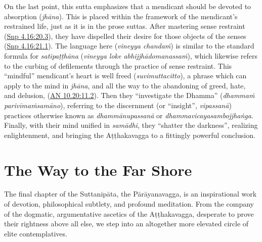 \documentclass[12pt,openany]{book}%
\begin{document}
On the last point, this sutta emphasizes that a mendicant should be devoted to absorption (\textit{\textsanskrit{jhāna}}). This is placed within the framework of the mendicant’s restrained life, just as it is in the prose suttas. After mastering sense restraint (\href{https://suttacentral.net/snp4.16/en/sujato\#20.3}{Snp 4.16:20.3}), they have dispelled their desire for those objects of the senses (\href{https://suttacentral.net/snp4.16/en/sujato\#21.1}{Snp 4.16:21.1}). The language here (\textit{vineyya \textsanskrit{chandaṁ}}) is similar to the standard formula for \textit{\textsanskrit{satipaṭṭhāna}} (\textit{vineyya loke \textsanskrit{abhijjhādomanassaṁ}}), which likewise refers to the curbing of defilements through the practice of sense restraint. This “mindful” mendicant’s heart is well freed (\textit{suvimuttacitto}), a phrase which can apply to the mind in \textit{\textsanskrit{jhāna}}, and all the way to the abandoning of greed, hate, and delusion, (\href{https://suttacentral.net/an10.20/en/sujato\#11.2}{AN 10.20:11.2}). Then they “investigate the Dhamma” (\textit{\textsanskrit{dhammaṁ} \textsanskrit{parivīmaṁsamāno}}), referring to the discernment (or “insight”, \textit{\textsanskrit{vipassanā}}) practices otherwise known as \textit{\textsanskrit{dhammānupassanā}} or \textit{\textsanskrit{dhammavicayasambojjhaṅga}}. Finally, with their mind unified in \textit{\textsanskrit{samādhi}}, they “shatter the darkness”, realizing enlightenment, and bringing the \textsanskrit{Aṭṭhakavagga} to a fittingly powerful conclusion.

\section*{The Way to the Far Shore}

The final chapter of the \textsanskrit{Suttanipāta}, the \textsanskrit{Pārāyanavagga}, is an inspirational work of devotion, philosophical subtlety, and profound meditation. From the company of the dogmatic, argumentative ascetics of the \textsanskrit{Aṭṭhakavagga}, desperate to prove their rightness above all else, we step into an altogether more elevated circle of elite contemplatives.
\end{document}
